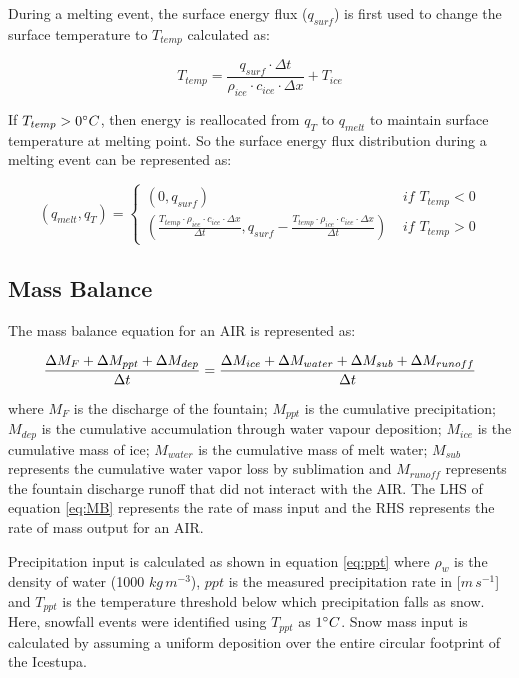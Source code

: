 \documentclass[utf8]{frontiersSCNS} %
\begin{document}
During a melting event, the surface energy flux ($q_{surf}$) is first used to change the surface temperature to
$T_{temp}$ calculated as:

\begin{equation} T_{temp} =\frac{q_{surf} \cdot \Delta t}{\rho_{ice} \cdot c_{ice} \cdot \Delta x} + T_{ice} \end{equation}

If $T_{temp} > 0 \degree C$, then energy is reallocated from $q_{T}$ to $q_{melt}$ to maintain surface temperature at
melting point. So the surface energy flux distribution during a melting event can be represented as:

\begin{equation} 
    (q_{melt}, q_{T}) = \left\{ \begin{array}{ll}
            (0, q_{surf}) & \textit{ if } T_{temp} < 0\\
            (\frac{T_{temp} \cdot \rho_{ice} \cdot c_{ice} \cdot \Delta x}{\Delta t}, q_{surf}-\frac{T_{temp} \cdot \rho_{ice} \cdot c_{ice} \cdot \Delta x}{\Delta t}  ) & \textit{ if } T_{temp} > 0
    \end{array} \right.  
\end{equation} 


\subsection{Mass Balance} 
The mass balance equation for an AIR is represented as:

\begin{equation}
    \frac{\Delta M_{F} + \Delta M_{ppt} + \Delta M_{dep}}{\Delta t} = \frac{\Delta M_{ice} +\Delta M_{water} +
    \Delta M_{sub} + \Delta M_{runoff}}{\Delta t}  \\
    \label{eq:MB} 
\end{equation}

where $M_{F}$ is the discharge of the fountain; $M_{ppt}$ is the cumulative precipitation;  $M_{dep}$ is the cumulative
accumulation through water vapour deposition; $M_{ice}$ is the cumulative mass of ice; $M_{water}$ is the cumulative
mass of melt water; $M_{sub}$ represents the cumulative water vapor loss by sublimation and $M_{runoff}$ represents the
fountain discharge runoff that did not interact with the AIR. The LHS of equation \ref{eq:MB} represents the rate of
mass input and the RHS represents the rate of mass output for an AIR. 

Precipitation input is calculated as shown in equation \ref{eq:ppt} where $\rho_{w}$ is the density of water (1000
$kg\,m^{-3}$), $ppt$ is the measured precipitation rate in [$m\,s^{-1}$] and $T_{ppt}$ is the temperature threshold
below which precipitation falls as snow. Here, snowfall events were identified using $T_{ppt}$ as $1 \degree C$. Snow
mass input is calculated by assuming a uniform deposition over the entire circular footprint of the Icestupa. 
\end{document}
